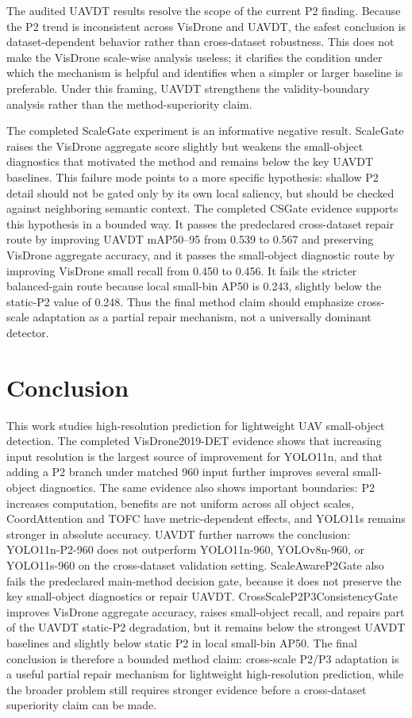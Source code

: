 \documentclass[journal]{IEEEtran}
\begin{document}
The audited UAVDT results resolve the scope of the current P2 finding. Because the P2 trend is inconsistent across VisDrone and UAVDT, the safest conclusion is dataset-dependent behavior rather than cross-dataset robustness. This does not make the VisDrone scale-wise analysis useless; it clarifies the condition under which the mechanism is helpful and identifies when a simpler or larger baseline is preferable. Under this framing, UAVDT strengthens the validity-boundary analysis rather than the method-superiority claim.

The completed ScaleGate experiment is an informative negative result. ScaleGate raises the VisDrone aggregate score slightly but weakens the small-object diagnostics that motivated the method and remains below the key UAVDT baselines. This failure mode points to a more specific hypothesis: shallow P2 detail should not be gated only by its own local saliency, but should be checked against neighboring semantic context. The completed CSGate evidence supports this hypothesis in a bounded way. It passes the predeclared cross-dataset repair route by improving UAVDT mAP50--95 from 0.539 to 0.567 and preserving VisDrone aggregate accuracy, and it passes the small-object diagnostic route by improving VisDrone small recall from 0.450 to 0.456. It fails the stricter balanced-gain route because local small-bin AP50 is 0.243, slightly below the static-P2 value of 0.248. Thus the final method claim should emphasize cross-scale adaptation as a partial repair mechanism, not a universally dominant detector.

\section{Conclusion}

This work studies high-resolution prediction for lightweight UAV small-object detection. The completed VisDrone2019-DET evidence shows that increasing input resolution is the largest source of improvement for YOLO11n, and that adding a P2 branch under matched 960 input further improves several small-object diagnostics. The same evidence also shows important boundaries: P2 increases computation, benefits are not uniform across all object scales, CoordAttention and TOFC have metric-dependent effects, and YOLO11s remains stronger in absolute accuracy. UAVDT further narrows the conclusion: YOLO11n-P2-960 does not outperform YOLO11n-960, YOLOv8n-960, or YOLO11s-960 on the cross-dataset validation setting. ScaleAwareP2Gate also fails the predeclared main-method decision gate, because it does not preserve the key small-object diagnostics or repair UAVDT. CrossScaleP2P3ConsistencyGate improves VisDrone aggregate accuracy, raises small-object recall, and repairs part of the UAVDT static-P2 degradation, but it remains below the strongest UAVDT baselines and slightly below static P2 in local small-bin AP50. The final conclusion is therefore a bounded method claim: cross-scale P2/P3 adaptation is a useful partial repair mechanism for lightweight high-resolution prediction, while the broader problem still requires stronger evidence before a cross-dataset superiority claim can be made.



\end{document}
